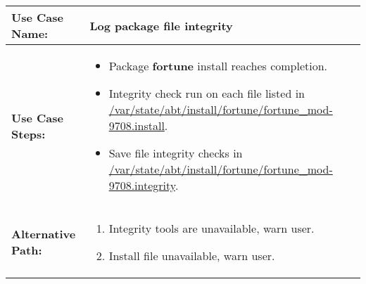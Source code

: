 \medskip

\begin{tabularx}{\linewidth}{|l|X|}
\hline
\textbf{Use Case Name:} & \textbf{Log package file integrity} \\
\hline
\textbf{Use Case Steps:} & 
\begin{minipage}{\linewidth} 
  \vspace{0.05em}
  \begin{itemize}
    \item Package \textbf{fortune} install reaches completion.
    \item Integrity check run on each file listed in \url{/var/state/abt/install/fortune/fortune_mod-9708.install}.
    \item Save file integrity checks in \url{/var/state/abt/install/fortune/fortune_mod-9708.integrity}.
  \end{itemize}
  \vspace{0.05em}
\end{minipage}
\\
\hline 
\textbf{Alternative Path:} &
\begin{minipage}{\linewidth}
  \vspace{0.05em} 
  \begin{enumerate}
    \item Integrity tools are unavailable, warn user.
    \item Install file unavailable, warn user.
  \end{enumerate}
  \vspace{0.05em} 
\end{minipage}
\\
\hline
\end{tabularx}